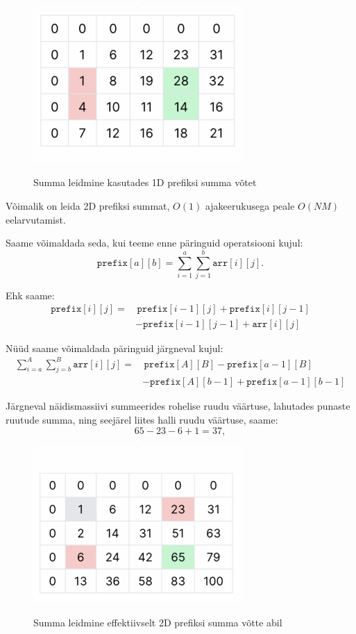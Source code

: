 \documentclass{trkut}
\theoremstyle{definition}
\begin{document}
\begin{appendices}
\begin{figure}[H]%
    \includegraphics[width=8cm]{pr2.png}%
    \caption{Summa leidmine kasutades 1D prefiksi summa võtet}%
    \label{EMaxx}%
\end{figure}

Võimalik on leida 2D prefiksi summat, $O(1)$ ajakeerukusega peale $O(NM)$ eelarvutamist.


Saame võimaldada seda, kui teeme enne päringuid operatsiooni kujul:
$$
\texttt{prefix}[a][b]=\sum_{i=1}^{a} \sum_{j=1}^{b} \texttt{arr}[i][j].
$$

Ehk saame:
$$
\begin{aligned}
\texttt{prefix}[i][j] =& \, \texttt{prefix}[i-1][j]+ \texttt{prefix}[i][j-1] \\
	&- \texttt{prefix}[i-1][j-1]+ \texttt{arr}[i][j]
\end{aligned}
$$

Nüüd saame võimaldada päringuid järgneval kujul:
$$
\begin{aligned}
\sum_{i=a}^{A} \sum_{j=b}^{B} \texttt{arr}[i][j]=&\,\texttt{prefix}[A][B]
		- \texttt{prefix}[a-1][B] \\
		&- \texttt{prefix}[A][b-1] + \texttt{prefix}[a-1][b-1]
\end{aligned}
$$


Järgneval näidismassiivi summeerides rohelise ruudu väärtuse, lahutades punaste ruutude summa, ning seejärel liites halli ruudu väärtuse, saame:
$$
65-23-6+1 = 37,
$$
\begin{figure}[H]%
    \includegraphics[width=8cm]{pr3.png}%
    \caption{Summa leidmine effektiivselt 2D prefiksi summa võtte abil}%
    \label{EMaxx}%
\end{figure}


\end{appendices}
\end{document}
